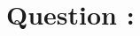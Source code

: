 \documentclass[12pt,onecolumn,a4paper]{article}
\newcommand\question{\section{Question \numberstringnum{\thesection}:}}
\begin{document}
	\FloatBarrier
	\question%

	
	
	\newpage
	
	
	
\end{document}
